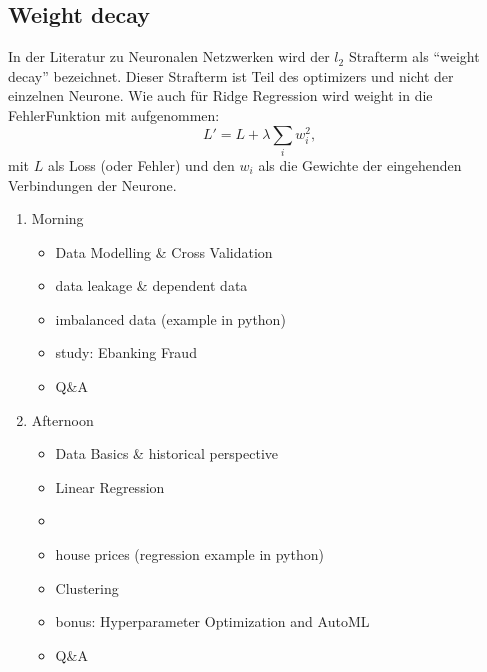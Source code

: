 \documentclass[letterpaper,10pt,english]{jupyterBook}
\begin{document}
\subsection{Weight decay}
\label{\detokenize{Regression_Techniques:weight-decay}}
\sphinxAtStartPar
In der Literatur zu Neuronalen Netzwerken wird der \(l_2\) Strafterm als “weight decay” bezeichnet.
Dieser Strafterm ist Teil des optimizers und nicht der einzelnen Neurone. Wie auch für Ridge Regression wird weight in die Fehler\sphinxhyphen{}Funktion mit aufgenommen:
\begin{equation*}
L' = L + \lambda\sum_i w_i^2, 
\end{equation*}
\sphinxAtStartPar
mit \(L\) als Loss (oder Fehler) und den \(w_i\) als die Gewichte der eingehenden Verbindungen der Neurone.
\begin{enumerate}
%
\item {} 
\sphinxAtStartPar
Morning
\begin{itemize}
\item {} 
\sphinxAtStartPar
Data Modelling \& Cross Validation

\item {} 
\sphinxAtStartPar
data leakage \& dependent data

\item {} 
\sphinxAtStartPar
imbalanced data (example in python)

\item {} 
\sphinxAtStartPar
study: Ebanking Fraud

\item {} 
\sphinxAtStartPar
Q\&A

\end{itemize}



\item {} 
\sphinxAtStartPar
Afternoon
\begin{itemize}
\item {} 
\sphinxAtStartPar
Data Basics \& historical perspective

\item {} 
\sphinxAtStartPar
Linear Regression

\item {} 
\sphinxAtStartPar
{}

\item {} 
\sphinxAtStartPar
house prices (regression example in python)

\item {} 
\sphinxAtStartPar
Clustering

\item {} 
\sphinxAtStartPar
bonus: Hyperparameter Optimization and AutoML

\item {} 
\sphinxAtStartPar
Q\&A

\end{itemize}

\end{enumerate}
\end{document}

